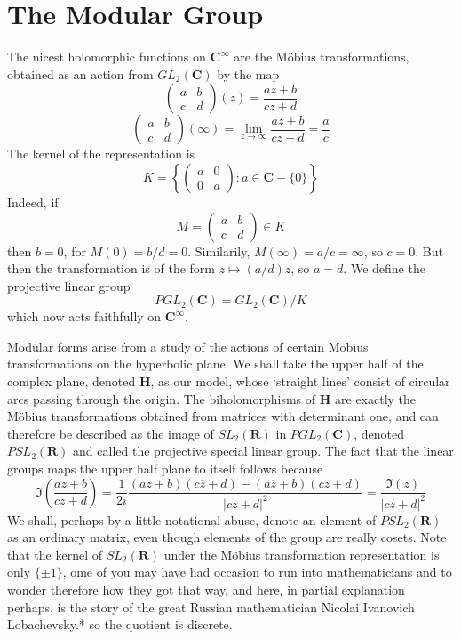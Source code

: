 \section{The Modular Group}

The nicest holomorphic functions on $\mathbf{C}^\infty$ are the M\"{o}bius transformations, obtained as an action from $GL_2(\mathbf{C})$ by the map
%
\[ \begin{pmatrix} a & b \\ c & d \end{pmatrix}(z)  = \frac{az + b}{cz + d} \]
%
\[ \begin{pmatrix} a & b \\ c & d \end{pmatrix}(\infty) = \lim_{z \to \infty } \frac{az + b}{cz + d} = \frac{a}{c} \]
%
The kernel of the representation is
%
\[ K = \left\{ \begin{pmatrix} a & 0 \\ 0 & a \end{pmatrix} : a \in \mathbf{C} - \{ 0 \} \right\} \]
%
Indeed, if
%
\[ M = \begin{pmatrix} a & b \\ c & d \end{pmatrix} \in K \]
%
then $b = 0$, for $M(0) = b/d = 0$. Similarily, $M(\infty) = a/c = \infty$, so $c = 0$. But then the transformation is of the form $z \mapsto (a/d) z$, so $a = d$. We define the projective linear group
%
\[ PGL_2(\mathbf{C}) = GL_2(\mathbf{C})/K \]
%
which now acts faithfully on $\mathbf{C}^\infty$.

Modular forms arise from a study of the actions of certain M\"{o}bius transformations on the hyperbolic plane. We shall take the upper half of the complex plane, denoted $\mathbf{H}$, as our model, whose `straight lines' consist of circular arcs passing through the origin. The biholomorphisms of $\mathbf{H}$ are exactly the M\"{o}bius transformations obtained from matrices with determinant one, and can therefore be described as the image of $SL_2(\mathbf{R})$ in $PGL_2(\mathbf{C})$, denoted $PSL_2(\mathbf{R})$ and called the projective special linear group. The fact that the linear groups maps the upper half plane to itself follows because
%
\[ \Im \left( \frac{az + b}{cz + d} \right) = \frac{1}{2i} \frac{(az + b)(c\overline{z} + d) - (a\overline{z} + b)(cz + d)}{|cz + d|^2} = \frac{\Im(z)}{|cz+d|^2} \]
%
We shall, perhaps by a little notational abuse, denote an element of $PSL_2(\mathbf{R})$ as an ordinary matrix, even though elements of the group are really cosets. Note that the kernel of $SL_2(\mathbf{R})$ under the M\"{o}bius transformation representation is only $\{ \pm 1 \}$, ome of you may have had occasion to run into mathematicians and to wonder therefore how they got that way, and here, in partial explanation perhaps, is the story of the great Russian mathematician Nicolai Ivanovich Lobachevsky.*
so the quotient is discrete.

